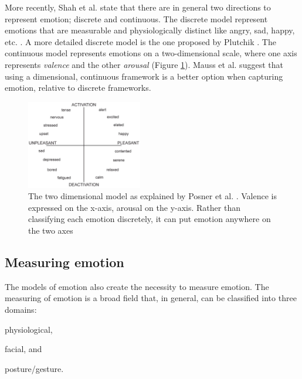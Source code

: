 \documentclass{sigchi}
\begin{document}
More recently, Shah et al. \cite{Shah2015} state that there are in general two directions to represent emotion; discrete and continuous. The discrete model represent emotions that are measurable and physiologically distinct like angry, sad, happy, etc. \cite{Ekman1992}. A more detailed discrete model is the one proposed by Plutchik \cite{Plutchik1980}. The continuous model represents emotions on a two-dimensional scale, where one axis represents \textit{valence} and the other \textit{arousal} \cite{Posner2005} (Figure \ref{fig:circumplex_model}). Mauss et al. \cite{Mauss2009} suggest that using a dimensional, continuous framework is a better option when capturing emotion, relative to discrete frameworks. 

\begin{figure}[ht]
    \centering
    \includegraphics[width=0.45\textwidth]{images/CircumplexModel.jpg}
    \caption{The two dimensional model as explained by Posner et al. \protect\cite{Posner2005}. Valence is expressed on the x-axis, arousal on the y-axis. Rather than classifying each emotion discretely, it can put emotion anywhere on the two axes}
    \label{fig:circumplex_model}
\end{figure}

\subsection{Measuring emotion} %
\label{sub:measuring_emotion}
The models of emotion also create the necessity to measure emotion. The measuring of emotion is a broad field that, in general, can be classified into three domains:
\begin{enumerate*}[label=(\alph*)]
  \item physiological,
  \item facial, and
  \item posture/gesture.
\end{enumerate*}
\end{document}
